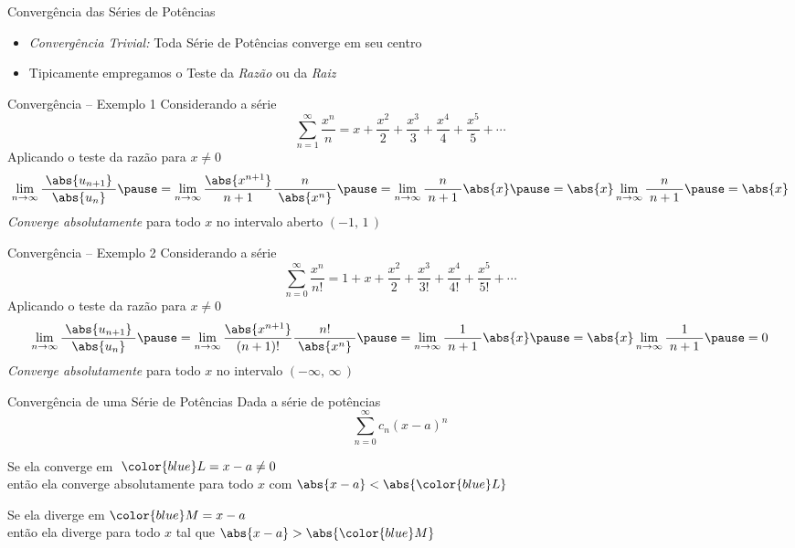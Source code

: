 \begin{frame}{Convergência das Séries de Potências}
  \begin{itemize}[<+->]
    \item \emph{Convergência Trivial:} Toda Série de Potências converge em seu centro\\[5mm]
    \item Tipicamente empregamos o Teste da \emph{Razão} ou da \emph{Raiz}
  \end{itemize}
\end{frame}

\begin{frame}{Convergência -- Exemplo 1}
Considerando a série
\[
  \sum_{n=1}^{\infty} \frac{x^n}{n}
  = x + \frac{x^2}{2}
      + \frac{x^3}{3}
      + \frac{x^4}{4}
      + \frac{x^5}{5}
      + \cdots
\]
\pause
Aplicando o teste da razão para $x\neq 0$
\[
  \lim_{n\to\infty} \frac{\;\abs{u_{n+1}}\;}{\abs{u_n}}
  \pause = \lim_{n\to\infty} \frac{\abs{x^{n+1}}}{\;n+1\;} \frac{n}{\;\abs{x^n}\;}
  \pause = \lim_{n\to\infty} \frac{n}{\;n+1\;} \abs{x}
  \pause = \abs{x} \lim_{n\to\infty} \frac{n}{\;n+1\;}
  \pause = \abs{x}
\]
\pause
\emph{Converge absolutamente} para todo $x$ no intervalo aberto $(-1,\,1\,)$
\end{frame}


\begin{frame}{Convergência -- Exemplo 2}
Considerando a série
\[
  \sum_{n=0}^{\infty} \frac{x^n}{n!}
  = 1 + x
      + \frac{x^2}{2}
      + \frac{x^3}{3!}
      + \frac{x^4}{4!}
      + \frac{x^5}{5!}
      + \cdots
\]
\pause
Aplicando o teste da razão para $x\neq 0$
\[
  \lim_{n\to\infty} \frac{\;\abs{u_{n+1}}\;}{\abs{u_n}}
  \pause = \lim_{n\to\infty} \frac{\abs{x^{n+1}}}{\;(n+1)!\;} \frac{n!}{\;\abs{x^n}\;}
  \pause = \lim_{n\to\infty} \frac{1}{\;n+1\;} \abs{x}
  \pause = \abs{x} \lim_{n\to\infty} \frac{1}{\;n+1\;}
  \pause = 0
\]
\pause
\emph{Converge absolutamente} para todo $x$ no intervalo $(-\infty,\,\infty\,)$
\end{frame}

\begin{frame}{Convergência de uma Série de Potências}
  Dada a série de potências
  \[\sum_{n=0}^\infty c_n(x-a)^n\]

  \pause
  \vspace{\baselineskip}
  Se ela converge em $\;{\color{blue}L}=x-a\neq 0$ \\[1mm] \pause
  então ela converge absolutamente para todo $x$ com $\abs{x-a}<\abs{{\color{blue}L}}$

  \pause
  \vspace{\baselineskip}
  Se ela diverge em ${\color{blue}M}=x-a$ \\[1mm] \pause
  então ela diverge para todo $x$ tal que $\abs{x-a}>\abs{{\color{blue}M}}$
\end{frame}


